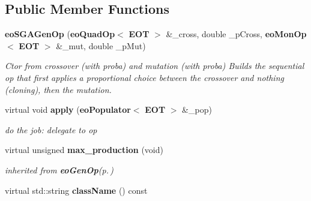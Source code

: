 \subsection*{Public Member Functions}
\begin{CompactItemize}
\item 
{\bf eo\-SGAGen\-Op} ({\bf eo\-Quad\-Op}$<$ {\bf EOT} $>$ \&\_\-cross, double \_\-p\-Cross, {\bf eo\-Mon\-Op}$<$ {\bf EOT} $>$ \&\_\-mut, double \_\-p\-Mut)\label{classeo_s_g_a_gen_op_a0}

\begin{CompactList}\small\item\em Ctor from crossover (with proba) and mutation (with proba) Builds the sequential op that first applies a proportional choice between the crossover and nothing (cloning), then the mutation. \item\end{CompactList}\item 
virtual void {\bf apply} ({\bf eo\-Populator}$<$ {\bf EOT} $>$ \&\_\-pop)\label{classeo_s_g_a_gen_op_a1}

\begin{CompactList}\small\item\em do the job: delegate to op \item\end{CompactList}\item 
virtual unsigned {\bf max\_\-production} (void)\label{classeo_s_g_a_gen_op_a2}

\begin{CompactList}\small\item\em inherited from {\bf eo\-Gen\-Op}{\rm (p.\,\pageref{classeo_gen_op})} \item\end{CompactList}\item 
virtual std::string {\bf class\-Name} () const \label{classeo_s_g_a_gen_op_a3}

\end{CompactItemize}
